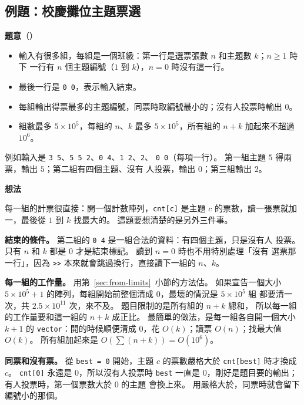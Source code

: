 \subsection{例題：校慶攤位主題票選}
\label{sec:ex-vote}

\textbf{題意}（）

\begin{itemize}
\item 輸入有很多組，每組是一個班級：第一行是選票張數 $n$ 和主題數 $k$；$n \ge 1$ 時下
一行有 $n$ 個主題編號（$1$ 到 $k$），$n = 0$ 時沒有這一行。
\item 最後一行是 \texttt{0 0}，表示輸入結束。
\item 每組輸出得票最多的主題編號，同票時取編號最小的；沒有人投票時輸出 $0$。
\item 組數最多 $5 \times 10^5$，每組的 $n$、$k$ 最多 $5 \times 10^5$，所有組的 $n + k$
加起來不超過 $10^6$。
\end{itemize}

例如輸入是 \texttt{3 5}、\texttt{5 5 2}、\texttt{0 4}、\texttt{1 2}、\texttt{2}、
\texttt{0 0}（每項一行）。 第一組主題 $5$ 得兩票，輸出 $5$；第二組有四個主題、沒有
人投票，輸出 $0$；第三組輸出 $2$。

\textbf{想法}

每一組的計票很直接：開一個計數陣列，\texttt{cnt[c]} 是主題 $c$ 的票數，讀一張票就加
一，最後從 $1$ 到 $k$ 找最大的。 這題要想清楚的是另外三件事。

\textbf{結束的條件。} 第二組的 \texttt{0 4} 是一組合法的資料：有四個主題，只是沒有人
投票。 只有 $n$ 和 $k$ 都是 $0$ 才是結束標記。 讀到 $n = 0$ 時也不用特別處理「沒有
選票那一行」，因為 \texttt{>>} 本來就會跳過換行，直接讀下一組的 $n$、$k$。

\textbf{每一組的工作量。} 用第~\ref{sec:from-limits}~小節的方法估。 如果宣告一個大小
$5 \times 10^5 + 1$ 的陣列，每組開始前整個清成 $0$，最壞的情況是 $5 \times 10^5$ 組
都要清一次，共 $2.5 \times 10^{11}$ 次，來不及。 題目限制的是所有組的 $n + k$ 總和，
所以每一組的工作量要和這一組的 $n + k$ 成正比。 最簡單的做法，是每一組各自開一個大小
$k + 1$ 的 \texttt{vector}：開的時候順便清成 $0$，花 $O(k)$；讀票 $O(n)$；找最大值
$O(k)$。 所有組加起來是 $O(\sum (n + k)) = O(10^6)$。

\textbf{同票和沒有票。} 從 \texttt{best = 0} 開始，主題 $c$ 的票數嚴格大於
\texttt{cnt[best]} 時才換成 $c$。 \texttt{cnt[0]} 永遠是 $0$，所以沒有人投票時
\texttt{best} 一直是 $0$，剛好是題目要的輸出；有人投票時，第一個票數大於 $0$ 的主題
會換上來。 用嚴格大於，同票時就會留下編號小的那個。

